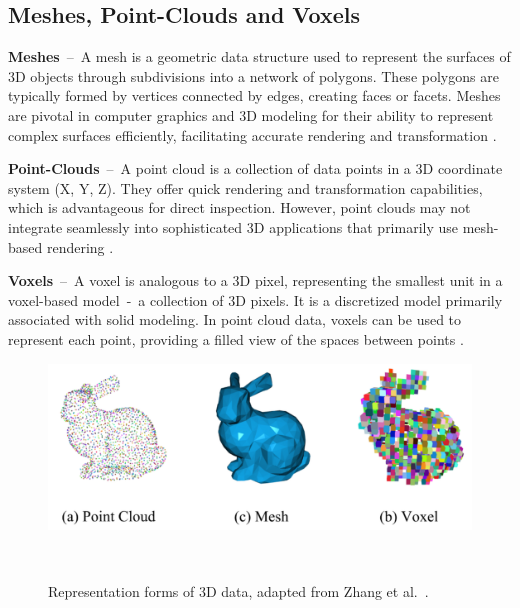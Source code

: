 \subsection{Meshes, Point-Clouds and Voxels}\label{MPCV}

\textbf{Meshes}~--~A mesh is a geometric data structure used to represent the surfaces of 3D objects through subdivisions into a network of polygons. These polygons are typically formed by vertices connected by edges, creating faces or facets. Meshes are pivotal in computer graphics and 3D modeling for their ability to represent complex surfaces efficiently, facilitating accurate rendering and transformation \citep{lahav2020meshwalker, Zhang_2023}.

\textbf{Point-Clouds}~--~A point cloud is a collection of data points in a 3D coordinate system (X, Y, Z). They offer quick rendering and transformation capabilities, which is advantageous for direct inspection. However, point clouds may not integrate seamlessly into sophisticated 3D applications that primarily use mesh-based rendering \citep{voxels, Zhang_2023}.

\textbf{Voxels}~--~A voxel is analogous to a 3D pixel, representing the smallest unit in a voxel-based model~-~a collection of 3D pixels. It is a discretized model primarily associated with solid modeling. In point cloud data, voxels can be used to represent each point, providing a filled view of the spaces between points \citep{voxels, Zhang_2023}.

\begin{figure}[H]
    \centering
      \includegraphics[width=.8\columnwidth]{figures/basics/mpcv.png}
      \caption{Representation forms of 3D data, adapted from Zhang et al.~\citep{Zhang_2023}.}~\label{fig:mpcv}
\end{figure}